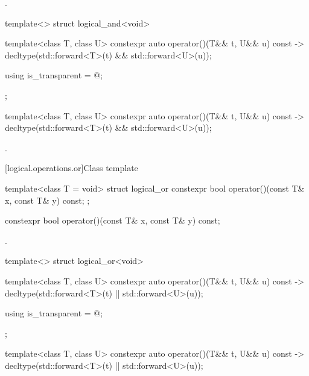 \begin{itemdescr}
\pnum
\returns
{}.
\end{itemdescr}

%
\begin{itemdecl}
template<> struct logical_and<void> {
  template<class T, class U> constexpr auto operator()(T&& t, U&& u) const
    -> decltype(std::forward<T>(t) && std::forward<U>(u));

  using is_transparent = @\unspec@;
};
\end{itemdecl}

%
\begin{itemdecl}
template<class T, class U> constexpr auto operator()(T&& t, U&& u) const
    -> decltype(std::forward<T>(t) && std::forward<U>(u));
\end{itemdecl}

\begin{itemdescr}
\pnum
\returns
{}.
\end{itemdescr}

[logical.operations.or]{Class template }

\begin{indexed}{
%
}
\begin{itemdecl}
template<class T = void> struct logical_or {
  constexpr bool operator()(const T& x, const T& y) const;
};
\end{itemdecl}
\end{indexed}

%
\begin{itemdecl}
constexpr bool operator()(const T& x, const T& y) const;
\end{itemdecl}

\begin{itemdescr}
\pnum
\returns
{}.
\end{itemdescr}

%
\begin{itemdecl}
template<> struct logical_or<void> {
  template<class T, class U> constexpr auto operator()(T&& t, U&& u) const
    -> decltype(std::forward<T>(t) || std::forward<U>(u));

  using is_transparent = @\unspec@;
};
\end{itemdecl}

%
\begin{itemdecl}
template<class T, class U> constexpr auto operator()(T&& t, U&& u) const
    -> decltype(std::forward<T>(t) || std::forward<U>(u));
\end{itemdecl}

